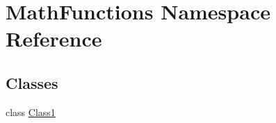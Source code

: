 \hypertarget{namespace_math_functions}{}\section{Math\+Functions Namespace Reference}
\label{namespace_math_functions}
\subsection*{Classes}
\begin{DoxyCompactItemize}
\item 
class \hyperlink{class_math_functions_1_1_class1}{Class1}
\end{DoxyCompactItemize}
